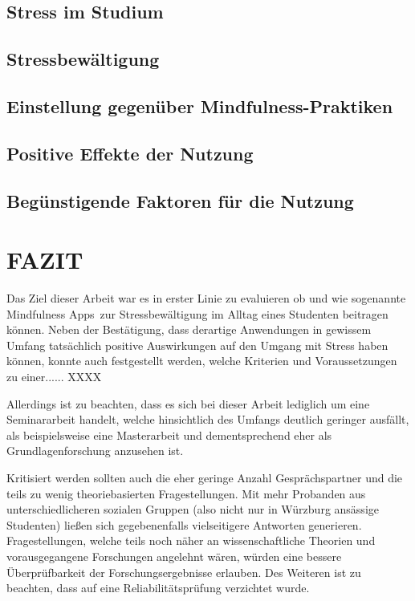 \documentclass[10pt]{article}
\begin{document}
\subsection{Stress im Studium}

\subsection{Stressbewältigung}
\subsection{Einstellung gegenüber Mindfulness-Praktiken}
\subsection{Positive Effekte der Nutzung}
\subsection{Begünstigende Faktoren für die Nutzung}

\section{FAZIT}
Das Ziel dieser Arbeit war  es in erster Linie zu evaluieren ob und wie sogenannte \grqq Mindfulness Apps\grqq\ zur Stressbewältigung im Alltag eines Studenten beitragen können. 
Neben der Bestätigung, dass derartige Anwendungen in gewissem Umfang tatsächlich positive Auswirkungen auf den Umgang mit Stress haben können, konnte auch festgestellt werden, welche Kriterien und Voraussetzungen zu einer...... XXXX

Allerdings ist zu beachten, dass es sich bei dieser Arbeit lediglich um eine Seminararbeit handelt, welche hinsichtlich des Umfangs deutlich geringer ausfällt, als beispielsweise eine Masterarbeit und dementsprechend eher als Grundlagenforschung anzusehen ist. 

Kritisiert werden sollten auch die eher geringe Anzahl Gesprächspartner und die teils zu wenig theoriebasierten  Fragestellungen. Mit mehr Probanden aus unterschiedlicheren sozialen Gruppen (also nicht nur in Würzburg ansässige Studenten) ließen sich gegebenenfalls vielseitigere Antworten generieren. Fragestellungen, welche teils noch näher an wissenschaftliche Theorien und vorausgegangene Forschungen angelehnt wären, würden eine bessere Überprüfbarkeit der Forschungsergebnisse erlauben. Des Weiteren ist zu beachten, dass auf eine Reliabilitätsprüfung verzichtet wurde.
\end{document}
